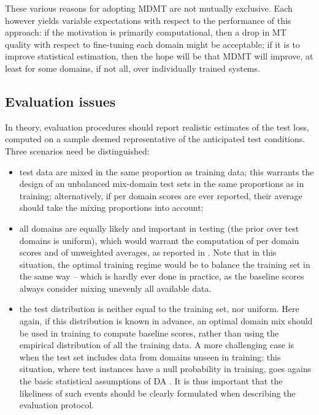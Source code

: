 \documentclass[11pt]{article}
\begin{document}
These various reasons for adopting MDMT are not mutually exclusive. Each however yields variable expectations with respect to the performance of this approach: if the motivation is primarily computational, then a drop in MT quality with respect to fine-tuning each domain might be acceptable; if it is to improve statistical estimation, then the hope will be that MDMT will improve, at least for some domains, if not all, over individually trained systems.

\subsection{Evaluation issues \label{ssec:evaluation}}

In theory, evaluation procedures should report realistic estimates of the test loss, computed on a sample deemed representative of the anticipated test conditions. Three scenarios need be distinguished:
\begin{itemize}
\item test data are mixed in the same proportion as training data; this warrants the design of an unbalanced mix-domain test sets in the same proportions as in training; alternatively, if per domain scores are ever reported, their average should take the mixing proportions into account;
\item all domains are equally likely and important in testing (the prior over test domains is uniform), which would warrant the computation of per domain scores and of unweighted averages, as reported in \cite{Farajian17multidomain,Su19exploring}. Note that in this situation, the optimal training regime would be to balance the training set in the same way -- which is hardly ever done in practice, as the baseline scores always consider mixing unevenly all available data.
\item the test distribution is neither equal to the training set, nor uniform. Here again, if this distribution is known in advance, an optimal domain mix should be used in training to compute baseline scores, rather than using the empirical distribution of all the training data. A more challenging case is when the test set includes data from domains unseen in training: this situation, where test instances have a null probability in training, goes agains the basic statistical assumptions of DA \cite{Shimodaira00improving}. It is thus important that the likeliness of such events should be clearly formulated when describing the evaluation protocol.
\end{itemize}
\end{document}
